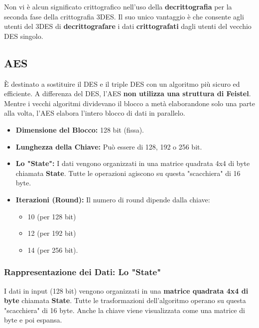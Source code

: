 \documentclass{article}
\begin{document}
\vspace{0.5cm}

Non vi è alcun significato crittografico nell'uso della \textbf{decrittografia} per la seconda fase della crittografia 3DES. Il suo unico vantaggio è che consente agli utenti del 3DES di \textbf{decrittografare} i dati \textbf{crittografati} dagli utenti del vecchio DES singolo.

\vspace{0.5cm}

\subsection*{AES}

È destinato a sostituire il DES e il triple DES con un algoritmo più sicuro ed efficiente. A differenza del DES, l'AES \textbf{non utilizza una struttura di Feistel}. Mentre i vecchi algoritmi dividevano il blocco a metà elaborandone solo una parte alla volta, l'AES elabora l'intero blocco di dati in parallelo.

\begin{itemize}
    \item \textbf{Dimensione del Blocco:} 128 bit (fissa).
    \item \textbf{Lunghezza della Chiave:} Può essere di 128, 192 o 256 bit.
    \item \textbf{Lo "State":} I dati vengono organizzati in una matrice quadrata 4x4 di byte chiamata \textbf{State}. Tutte le operazioni agiscono su questa "scacchiera" di 16 byte.
    \item \textbf{Iterazioni (Round):} Il numero di round dipende dalla chiave:
    \begin{itemize}
        \item 10 (per 128 bit)
        \item 12 (per 192 bit)
        \item 14 (per 256 bit).
    \end{itemize}
\end{itemize}

\vspace{0.5cm}

\subsubsection*{Rappresentazione dei Dati: Lo "State"}

I dati in input (128 bit) vengono organizzati in una \textbf{matrice quadrata 4x4 di byte} chiamata \textbf{State}. Tutte le trasformazioni dell'algoritmo operano su questa "scacchiera" di 16 byte. Anche la chiave viene visualizzata come una matrice di byte e poi espansa.
\end{document}
